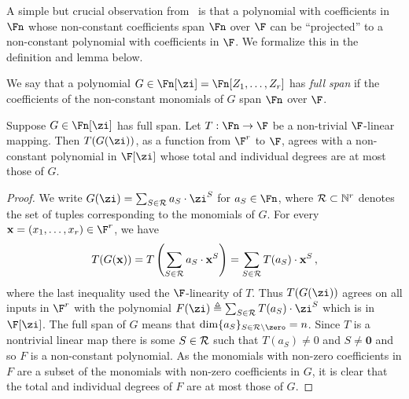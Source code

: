 A simple but crucial observation from~\cite{DG10} is that a polynomial with coefficients in $\Fn$ whose
non-constant coefficients span $\Fn$ over $\F$ can be ``projected'' to a non-constant polynomial with coefficients
in $\F$. We formalize this in the definition and lemma below.
%
%
%
%
\begin{definition}
  We say that a polynomial $G\in \Fn[\zi]=\Fn[Z_1,\ldots,Z_r]$ has \emph{full span}
  if the coefficients of the non-constant monomials of $G$
  span $\Fn$ over $\F$.

\end{definition}
\begin{lemma}\label{lem-can_project_expanding}
Suppose $G\in \Fn[\zi]$ has full span. Let $T:\Fn \to \F$ be a non-trivial $\F$-linear mapping.
Then $T(G(\zi))$, as a function from $\F^r$ to $\F$, agrees with a non-constant polynomial in $\F[\zi]$
whose total and individual degrees are at most those of $G$.
\end{lemma}
\begin{proof}
We write  $G(\zi)= \sum_{S\in {\cal R}} a_S\cdot
\zi^S$ for  $a_S\in \Fn$, where ${\cal R}\subset {\mathbb N}^r$ denotes the set of tuples corresponding
to the monomials of $G$.
For every $\mathbf{x}=(x_1,\ldots,x_r) \in \F^r$, we have
\[T(G(\mathbf{x})) = T\left( \sum_{S\in {\cal R}} a_S\cdot
\mathbf{x}^S\right) = \sum_{S\in {\cal R}}T(a_S)\cdot \mathbf{x}^S\,,\]
where the last inequality used the $\F$-linearity of $T$.
Thus $T(G(\zi))$ agrees on all inputs in $\F^r$ with the polynomial
$F(\zi)\triangleq \sum_{S\in {\cal R}}T(a_S)\cdot \mathbf{\zi} ^S$ which
is in $\F[\zi]$.
The full span of $G$ means that
  $\dim \{a_S\}_{S\in {\cal R}\setminus
\zero}=n$. Since $T$ is a nontrivial linear map there is some $S \in {\cal R}$ such that $T(a_S)\neq 0$ and $S\neq \mathbf{0}$
and so $F$ is a non-constant polynomial.
As the monomials with non-zero coefficients in
$F$ are a subset of the monomials with non-zero coefficients in $G$,
it is clear that
%
%
the total and individual degrees of $F$
%
are at most those of $G$.
\end{proof}

